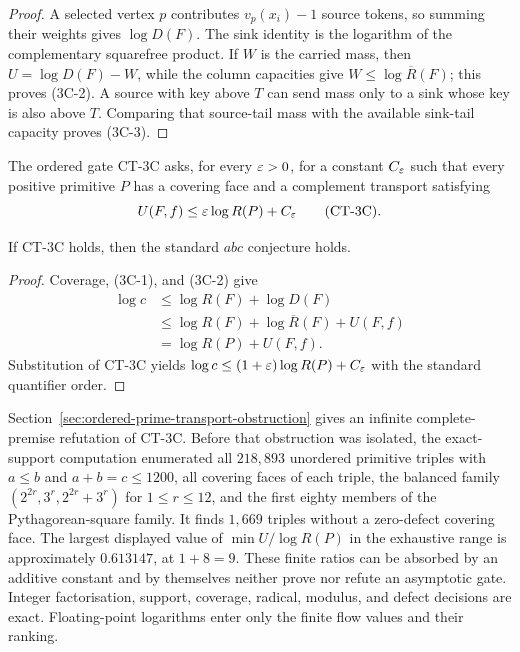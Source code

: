 \begin{proof}
A selected vertex $p$ contributes $v_p(x_i)-1$ source tokens, so summing
their weights gives $\log D(F)$.  The sink identity is the logarithm of the
complementary squarefree product.  If $W$ is the carried mass, then
$U=\log D(F)-W$, while the column capacities give
$W\le\log\overline R(F)$; this proves (3C-2).  A source with key above
$T$ can send mass only to a sink whose key is also above $T$.  Comparing that
source-tail mass with the available sink-tail capacity proves (3C-3).
\end{proof}

The ordered gate CT-3C asks, for every $\varepsilon>0$, for a constant $C_\varepsilon$
such that every positive primitive $P$ has a covering face and a complement
transport satisfying
\[
 U(F,f)\le\varepsilon\log R(P)+C_\varepsilon
 \qquad\text{(CT-3C)}.
\]

\begin{theorem}
\label{thm:three-arm-complement-transport-abc}
If CT-3C holds, then the standard $abc$ conjecture holds.
\end{theorem}

\begin{proof}
Coverage, (3C-1), and (3C-2) give
\[
 \begin{aligned}
 \log c
 &\le\log R(F)+\log D(F)\\
 &\le\log R(F)+\log\overline R(F)+U(F,f)\\
 &=\log R(P)+U(F,f).
 \end{aligned}
\]
Substitution of CT-3C yields
$\log c\le(1+\varepsilon)\log R(P)+C_\varepsilon$ with the standard quantifier order.
\end{proof}

Section~\ref{sec:ordered-prime-transport-obstruction} gives an infinite
complete-premise refutation of CT-3C.  Before that obstruction was isolated,
the exact-support computation enumerated all
$218{,}893$ unordered primitive triples with $a\le b$ and $a+b=c\le1200$,
all covering faces of each triple, the balanced family
$(2^{2r},3^r,2^{2r}+3^r)$ for $1\le r\le12$, and the first eighty members of
the Pythagorean-square family.  It finds $1{,}669$ triples without a
zero-defect covering face.  The largest displayed value of
$\min U/\log R(P)$ in the exhaustive range is approximately $0.613147$, at
$1+8=9$.  These finite ratios can be absorbed by an additive constant and by
themselves neither prove nor refute an asymptotic gate.  Integer
factorisation, support, coverage, radical, modulus, and defect decisions are
exact.  Floating-point logarithms enter only the finite flow values and their
ranking.

